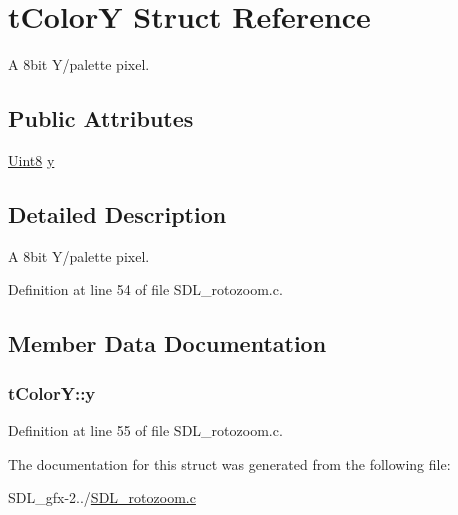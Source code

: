 \hypertarget{structt_color_y}{}\section{t\+Color\+Y Struct Reference}
\label{structt_color_y}


A 8bit Y/palette pixel.  


\subsection*{Public Attributes}
\begin{DoxyCompactItemize}
\item 
\hyperlink{_s_d_l__stdinc_8h_a2944638813a090aa23e62f4da842c3e2}{Uint8} \hyperlink{structt_color_y_a5bfc0bfa51aa91262c1f0dc59c2092a0}{y}
\end{DoxyCompactItemize}


\subsection{Detailed Description}
A 8bit Y/palette pixel. 

Definition at line 54 of file S\+D\+L\+\_\+rotozoom.\+c.



\subsection{Member Data Documentation}
\hypertarget{structt_color_y_a5bfc0bfa51aa91262c1f0dc59c2092a0}{}
\subsubsection[{y}]{ t\+Color\+Y\+::y}\label{structt_color_y_a5bfc0bfa51aa91262c1f0dc59c2092a0}


Definition at line 55 of file S\+D\+L\+\_\+rotozoom.\+c.



The documentation for this struct was generated from the following file\+:\begin{DoxyCompactItemize}
\item 
S\+D\+L\+\_\+gfx-\/2../\hyperlink{_s_d_l__rotozoom_8c}{S\+D\+L\+\_\+rotozoom.\+c}\end{DoxyCompactItemize}
